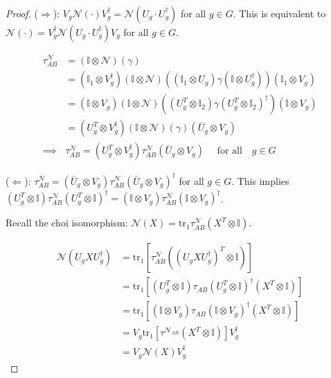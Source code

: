 \documentclass[../../note.tex]{subfiles}
\begin{document}
\begin{proof}
($\Rightarrow$): $V_g \mathcal{N} (\cdot) V_g^{\dagger} = \mathcal{N}(U_g \cdot U_g^{\dagger})$ for all $g\in G$. This is equivalent to $\mathcal{N}(\cdot) = V^{\dagger}_g \mathcal{N}(U_g \cdot U^{\dagger}_g)V_g$ for all $g\in G$.

\begin{align}
    \tau^{\mathcal{N}}_{AB} &= (\mathbb{I} \otimes \mathcal{N})(\gamma)\\
    &= (\mathbb{I}_1 \otimes V_{g}^{\dagger})(\mathbb{I} \otimes \mathcal{N})\left((\mathbb{I}_1 \otimes U_g)\gamma(\mathbb{I} \otimes U^{\dagger}_g)\right)(\mathbb{I}_1 \otimes V_g) \\
    &= (\mathbb{I} \otimes V_g)(\mathbb{I} \otimes \mathcal{N}) \left( (U_g^{T} \otimes \mathbb{I}_2) \gamma (U^T_g \otimes \mathbb{I}_2)^{\dagger} \right)(\mathbb{I} \otimes V_g) \\
    &= (U^T_g \otimes V^{\dagger}_g)(\mathbb{I}\otimes \mathcal{N})(\gamma)(\bar{U}_g \otimes V_g)\\
    \implies & \tau^{\mathcal{N}}_{AB}= (U^T_g \otimes V^{\dagger}_g) \tau^{\mathcal{N}}_{AB} (\bar{U}_g \otimes V_g) \quad \text{ for all} \quad g \in G
\end{align}

($\Leftarrow$): $\tau^{\mathcal{N}}_{AB} = (\bar{U}_g \otimes V_g) \tau^{\mathcal{N}}_{AB} (\bar{U}_g \otimes V_g)^{\dagger}$ for all $g\in G$. This implies $(U_g^T \otimes \mathbb{I}) \tau^{\mathcal{N}}_{AB} (U_g^T \otimes \mathbb{I})^{\dagger} = (\mathbb{I}\otimes V_g)\tau^{\mathcal{N}}_{AB}(\mathbb{I} \otimes V_g)^{\dagger}$.


\noindent Recall the choi isomorphism: $\mathcal{N}(X) = \text{tr}_1 \tau^{\mathcal{N}}_{AB} (X^T \otimes \mathbb{I})$.

\begin{align}
    \mathcal{N}(U_g X U_g^{\dagger})&=\text{tr}_1 \left[\tau^{\mathcal{N}}_{AB}((U_g X U_g^{\dagger})^T \otimes \mathbb{I})\right]\\
    &= \text{tr}_1 \left[(U_g^T \otimes \mathbb{I})\tau_{AB} (U_g^T \otimes \mathbb{I})^{\dagger}(X^T \otimes \mathbb{I})\right]\\
    &= \text{tr}_1 \left[(\mathbb{I}\otimes V_g)\tau_{AB} (\mathbb{I} \otimes V_g)^{\dagger} (X^T \otimes \mathbb{I})\right]\\
    &=V_g \text{tr}_1 \left[\tau^{\mathcal{N}_{AB}} (X^T \otimes \mathbb{I}) \right]V_g^{\dagger}\\
    &= V_g \mathcal{N}(X)V_g^{\dagger}
\end{align}
\end{proof}
\end{document}
